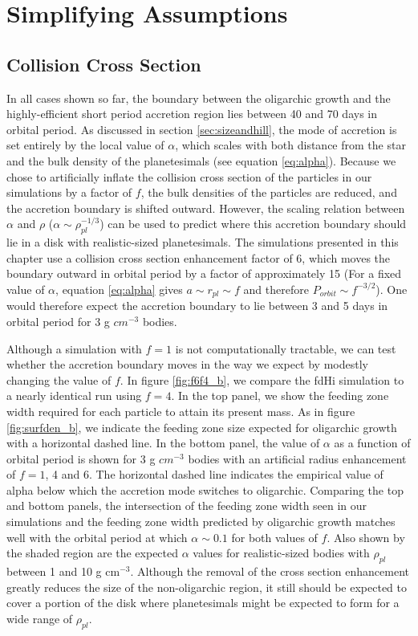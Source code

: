 \section{Simplifying Assumptions}\label{sec:assump}

\subsection{Collision Cross Section}

In all cases shown so far, the boundary between the
oligarchic growth and the highly-efficient short period accretion
region lies between 40 and 70 days in orbital period. As discussed in section \ref{sec:sizeandhill}, the mode of accretion is
set entirely by the local value of $\alpha$, which scales with both
distance from the star and the bulk density of the planetesimals (see
equation \ref{eq:alpha}). Because we chose to artificially inflate the
collision cross section of the particles in our simulations by a factor of $f$, the bulk densities
of the particles are reduced, and the accretion boundary is shifted outward.
However, the scaling relation between $\alpha$ and $\rho$ ($\alpha \sim \rho_{pl}^{-1/3}$) can be used
to predict where this accretion boundary should lie in a disk with realistic-sized planetesimals. The simulations
presented in this chapter use a collision cross section enhancement factor of 6, which moves the boundary outward in orbital
period by a factor of approximately 15 (For a fixed value of $\alpha$, equation \ref{eq:alpha} gives $a \sim r_{pl} \sim f$ and therefore $P_{orbit} \sim f^{-3/2}$). One would therefore expect the accretion boundary to lie between 3 and 5 days in orbital period
for 3 g $cm^{-3}$ bodies.

Although a simulation with $f=1$ is not computationally tractable, we
can test whether the accretion boundary moves in the way we expect by
modestly changing the value of $f$. In figure \ref{fig:f6f4_b}, we
compare the fdHi simulation to a nearly identical run using $f=4$. In
the top panel, we show the feeding zone width required for each particle to
attain its present mass. As in figure \ref{fig:surfden_b}, we indicate the feeding
zone size expected for oligarchic growth with a horizontal dashed line. In the bottom panel, the value
of $\alpha$ as a function of orbital period is shown for 3 g $cm^{-3}$
bodies with an artificial radius enhancement of $f=1$, 4 and 6. The
horizontal dashed line indicates the empirical value of alpha below which the
accretion mode switches to oligarchic. Comparing the top and
bottom panels, the intersection of the feeding zone width seen in our simulations and the
feeding zone width predicted by oligarchic growth matches well with the orbital period at which $\alpha
\sim 0.1$ for both values of $f$.  Also shown by the shaded region are the expected $\alpha$ values for
realistic-sized bodies with $\rho_{pl}$ between 1 and 10 g cm$^{-3}$. Although the removal of the cross section
enhancement greatly reduces the size of the non-oligarchic region, it still should be expected to cover a portion of the
disk where planetesimals might be expected to form \cite{mulders18} for a wide range of $\rho_{pl}$.

